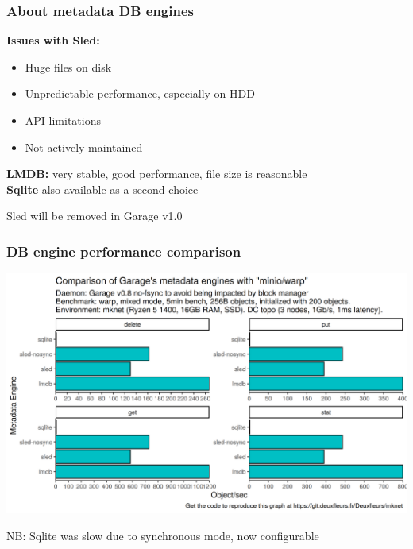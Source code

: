 \documentclass[aspectratio=169,xcolor={svgnames}]{beamer}
\begin{document}
\begin{frame}
	\frametitle{About metadata DB engines}
	\textbf{Issues with Sled:}
	\vspace{1em}
	\begin{itemize}
		\item Huge files on disk
			\vspace{.5em}
		\item Unpredictable performance, especially on HDD
			\vspace{.5em}
		\item API limitations
			\vspace{.5em}
		\item Not actively maintained
	\end{itemize}

	\vspace{2em}
	\textbf{LMDB:} very stable, good performance, file size is reasonable\\
	\textbf{Sqlite} also available as a second choice

	\vspace{1em}
	Sled will be removed in Garage v1.0
\end{frame}

\begin{frame}
	\frametitle{DB engine performance comparison}
	\begin{center}
		\includegraphics[width=.6\linewidth]{../assets/perf/db_engine.png}
	\end{center}
	NB: Sqlite was slow due to synchronous mode, now configurable
\end{frame}
\end{document}
